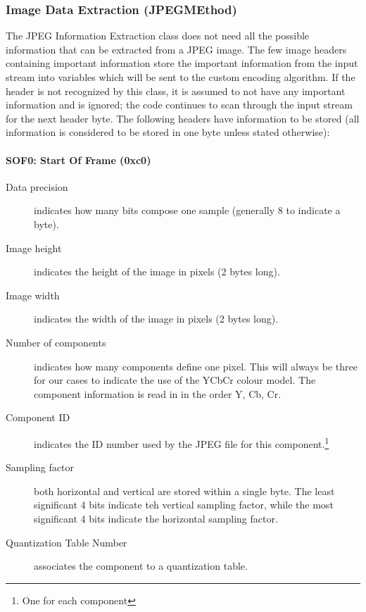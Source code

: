 \subsubsection{Image Data Extraction (JPEGMEthod)}

The JPEG Information Extraction class does not need all the possible information that can be extracted from a JPEG image. 
The few image headers containing important information store the important information from 
the input stream into variables which will be sent to the custom encoding algorithm. 
If the header is not recognized by this class, it is assumed to not have any important information and is ignored; 
the code continues to scan through the input stream for the next header byte. 
The following headers have  information to be stored (all information is considered to be stored in one byte unless stated otherwise):

\paragraph*{SOF0: Start Of Frame (0xc0)}
\begin{description}
	\item[Data precision] indicates how many bits compose one sample (generally 8 to indicate a byte).
	\item[Image height] indicates the height of the image in pixels (2 bytes long).
	\item[Image width] indicates the width of the image in pixels (2 bytes long).
	\item[Number of components] indicates how many components define one pixel. 
		This will always be three for our cases to indicate the use of the YCbCr colour model. 
		The component information is read in in the order Y, Cb, Cr.
	\item[Component ID] indicates the ID number used by the JPEG file for this component.\footnote{One for each component}
	\item[Sampling factor] both horizontal and vertical are stored within a single byte. 
		The least significant 4 bits indicate teh vertical sampling factor, while 
		the most significant 4 bits indicate the horizontal sampling factor.\footnotemark[1] 
	\item[Quantization Table Number] associates the component to a quantization table.\footnotemark[1] 
\end{description}

